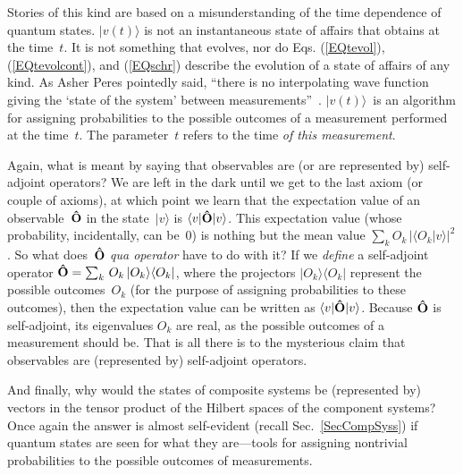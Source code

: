 \documentclass[12pt]{article}
\newcommand{\ket}[1]{\vert#1\rangle}
\newcommand{\braket}[2]{\langle#1\vert#2\rangle}
\newcommand{\ketbra}[2]{\vert#1\rangle\langle#2\vert}
\newcommand{\sandwich}[3]{\langle#1\vert#2\vert#3\rangle}
\newcommand{\hO}{{\bf\hat O}}
\begin{document}
Stories of this kind are based on a misunderstanding of the time dependence of quantum states. $\ket{v(t)}$ is not an instantaneous state of affairs that obtains at the time~$t$. It is not something that evolves, nor do Eqs. (\ref{EQtevol}), (\ref{EQtevolcont}), and (\ref{EQschr}) describe the evolution of a state of affairs of any kind. As Asher Peres pointedly said, ``there is no interpolating wave function giving the `state of the system' between measurements''~\cite{PeresSV}. $\ket{v(t)}$~is an algorithm for assigning probabilities to the possible outcomes of a measurement performed at the time~$t$. The parameter~$t$ refers to the time \textit{of this measurement}.

Again, what is meant by saying that observables are (or are represented by) self-adjoint operators? We are left in the dark until we get to the last axiom (or couple of axioms), at which point we learn that the expectation value of an observable~$\hO$ in the state~$\ket v$ is $\sandwich v\hO v$. This expectation value (whose probability, incidentally, can be~0) is nothing but the mean value $\sum_k O_k\,|\braket{O_k}v|^2$. So what does~$\hO$ \textit{qua operator} have to do with it? If we \textit{define} a self-adjoint operator $\hO=\sum_k\,O_k\,\ketbra{O_k}{O_k}$, where the projectors $\ketbra{O_k}{O_k}$ represent the possible outcomes~$O_k$ (for the purpose of assigning probabilities to these outcomes), then the expectation value can be written as $\sandwich v{\hO}v$. Because $\hO$ is self-adjoint, its eigenvalues $O_k$ are real, as the possible outcomes of a measurement should be. That is all there is to the mysterious claim that observables are (represented by) self-adjoint operators.

And finally, why would the states of composite systems be (represented by) vectors in the tensor product of the Hilbert spaces of the component systems? Once again the answer is almost self-evident (recall Sec.~\ref{SecCompSyss}) if quantum states are seen for what they are---tools for assigning nontrivial probabilities to the possible outcomes of measurements.
\end{document}
